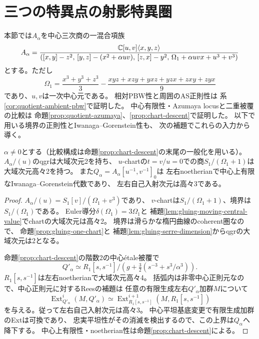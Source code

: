 \section{三つの特異点の射影特異圏}
\label{sec:quotient-singcat}

本節では$A_\alpha$を中心三次商の一混合項族
\[
 A_\alpha=\frac{\mathbb C[u,v]\langle x,y,z\rangle}
 {([x,y]-z^2,\,[y,z]-(x^2+\alpha uv),\,[z,x]-y^2,\,
   \Omega_1+\alpha uvx+u^3+v^3)}
\]
とする。ただし
\[
 \Omega_1=\frac{x^3+y^3+z^3}{3}
       -\frac{xyz+xzy+yxz+yzx+zxy+zyx}{9}
\]
であり、$u,v$は一次中心元である。
相対PBW性と周囲のAS正則性は
系\ref{cor:quotient-ambient-pbw}で証明した。
中心有限性・Azumaya locusと二重被覆の比較は
命題\ref{prop:quotient-azumaya}、\ref{prop:chart-descent}で証明した。
以下で用いる境界の正則性とIwanaga--Gorenstein性も、
次の補題でこれらの入力から導く。

\begin{lemma}[境界の正則性とchartのGorenstein性]
\label{lem:quotient-boundary-gorenstein}
$\alpha\ne0$とする（比較構成は命題\ref{prop:chart-descent}の末尾の一般化を用いる）。
$A_\alpha/(u)$のqgrは大域次元2を持ち、
$u$-chartの$t=v/u=0$での商$S_1/(\Omega_1+1)$は
大域次元高々2を持つ。
また$Q_\alpha=A_\alpha[u^{-1},v^{-1}]_0$は
左右noetherianで中心上有限なIwanaga--Gorenstein代数であり、
左右自己入射次元は高々3である。
\end{lemma}
\begin{proof}
$A_\alpha/(u)=S_1[v]/(\Omega_1+v^3)$であり、
$v$-chartは$S_1/(\Omega_1+1)$、境界は$S_1/(\Omega_1)$である。
Euler導分$\delta(\Omega_1)=3\Omega_1$と
補題\ref{lem:gluing-moving-central-value}でchartの大域次元は高々2。
境界は滑らかな楕円曲線のcoherent圏なので、
命題\ref{prop:gluing-one-chart}と
補題\ref{lem:gluing-serre-dimension}からqgrの大域次元は2となる。

命題\ref{prop:chart-descent}の階数2の中心\'etale被覆で
\[
 Q'_\alpha\simeq
 R_1[s,s^{-1}]/\left(g+\tfrac32(s^{-3}+s^3/\alpha^3)\right).
\]
$R_1[s,s^{-1}]$は左右noetherianで大域次元高々4。
括弧内は非零中心正則元なので、中心正則元に対するReesの補題は
任意の有限生成左右$Q'_\alpha$加群$M$について
\[
 \operatorname{Ext}^i_{Q'_\alpha}(M,Q'_\alpha)
 \simeq
 \operatorname{Ext}^{i+1}_{R_1[s,s^{-1}]}
                  (M,R_1[s,s^{-1}])
\]
を与える。従って左右自己入射次元は高々3。
中心平坦基底変更で有限生成加群のExtは可換であり、
忠実平坦性がその消滅を検出するので、この上界は$Q_\alpha$へ降下する。
中心上有限性・noetherian性は命題\ref{prop:chart-descent}による。
\end{proof}


